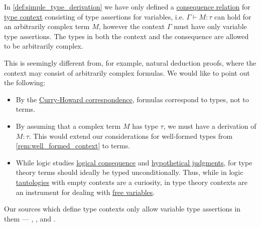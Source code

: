 \begin{remark}\label{rem:type_context_only_variables}
  In \cref{def:simple_type_derivation} we have only defined a \hyperref[def:consequence_relation]{consequence relation} for \hyperref[def:type_context]{type context} consisting of type assertions for variables, i.e. \( \Gamma \vdash M: \tau \) can hold for an arbitrarily complex term \( M \), however the context \( \Gamma \) must have only variable type assertions. The types in both the context and the consequence are allowed to be arbitrarily complex.

  This is seemingly different from, for example, natural deduction proofs, where the context may consist of arbitrarily complex formulas. We would like to point out the following:
  \begin{itemize}
    \item By the \hyperref[con:curry_howard_correspondence]{Curry-Howard correspondence}, formulas correspond to types, not to terms.

    \item By assuming that a complex term \( M \) has type \( \tau \), we must have a derivation of \( M: \tau \). This would extend our considerations for well-formed types from \cref{rem:well_formed_context} to terms.

    \item While logic studies \hyperref[def:consequence_relation]{logical consequence} and \hyperref[con:hypothetical_judgment]{hypothetical judgments}, for type theory terms should ideally be typed unconditionally. Thus, while in logic \hyperref[def:tautology]{tautologies} with empty contexts are a curiosity, in type theory contexts are an instrument for dealing with \hyperref[def:lambda_variable_freeness]{free variables}.
  \end{itemize}

  Our sources which define type contexts only allow variable type assertions in them ---
  \cite[19]{MartinLöf1984IntuitionisticTypeTheory},
  \cite[def. 2A5]{Hindley1997BasicSTT},
  \cite[def. 5.1.5]{Barendregt1992LambdaCalculiWithTypes} and
  \cite[\S 4.1]{Mimram2020ProgramEqualsProof}.
\end{remark}

